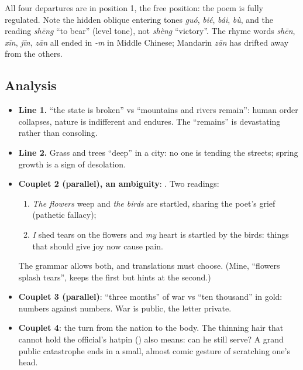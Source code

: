 All four departures are in position 1, the free position: the poem is fully regulated.
Note the hidden oblique entering tones  \emph{guó},  \emph{bié},
 \emph{bái},  \emph{bù}, and the reading  \emph{shēng} ``to bear''
(level tone), not \emph{shèng} ``victory''. The rhyme words  \emph{shēn}, 
\emph{xīn},  \emph{jīn},  \emph{zān} all ended in \emph{-m} in Middle
Chinese; Mandarin \emph{zān} has drifted away from the others.

\subsection{Analysis}
\begin{itemize}
  \item \textbf{Line 1.}  ``the state is broken'' vs  ``mountains and
        rivers remain'': human order collapses, nature is indifferent and endures. The
        ``remains'' is devastating rather than consoling.
  \item \textbf{Line 2.} Grass and trees ``deep'' in a city: no one is tending the
        streets; spring growth is a sign of desolation.
  \item \textbf{Couplet 2 (parallel), an ambiguity}: . Two
        readings:
        \begin{enumerate}
          \item \emph{The flowers} weep and \emph{the birds} are startled, sharing the
                poet's grief (pathetic fallacy);
          \item \emph{I} shed tears on the flowers and \emph{my} heart is startled by the
                birds: things that should give joy now cause pain.
        \end{enumerate}
        The grammar allows both, and translations must choose. (Mine, ``flowers splash
        tears'', keeps the first but hints at the second.)
  \item \textbf{Couplet 3 (parallel)}: ``three months'' of war vs ``ten thousand'' in gold:
        numbers against numbers. War is public, the letter private.
  \item \textbf{Couplet 4}: the turn from the nation to the body. The thinning hair that
        cannot hold the official's hatpin () also means: can he still serve?
        A grand public catastrophe ends in a small, almost comic gesture of scratching
        one's head.
\end{itemize}

